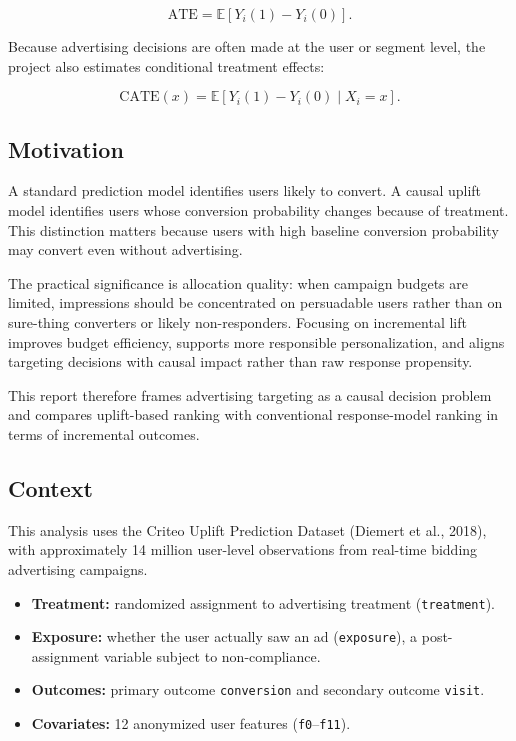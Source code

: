 \documentclass[journal,11pt,onecolumn]{IEEEtran}
\newcommand{\E}{\mathbb{E}}
\newcommand{\ATE}{\mathrm{ATE}}
\newcommand{\CATE}{\mathrm{CATE}}
\begin{document}
\[
    \ATE = \E[Y_i(1)-Y_i(0)].
\]

Because advertising decisions are often made at the user or segment level, the project also estimates conditional treatment effects:

\[
    \CATE(x)=\E[Y_i(1)-Y_i(0)\mid X_i=x].
\]

\subsection{Motivation}

A standard prediction model identifies users likely to convert. A causal uplift model identifies users whose conversion probability changes because of treatment. This distinction matters because users with high baseline conversion probability may convert even without advertising.

The practical significance is allocation quality: when campaign budgets are limited, impressions should be concentrated on persuadable users rather than on sure-thing converters or likely non-responders. Focusing on incremental lift improves budget efficiency, supports more responsible personalization, and aligns targeting decisions with causal impact rather than raw response propensity.

This report therefore frames advertising targeting as a causal decision problem and compares uplift-based ranking with conventional response-model ranking in terms of incremental outcomes.

\subsection{Context}

This analysis uses the Criteo Uplift Prediction Dataset (Diemert et al., 2018), with approximately 14 million user-level observations from real-time bidding advertising campaigns.

\begin{itemize}
    \item \textbf{Treatment:} randomized assignment to advertising treatment (\texttt{treatment}).
    \item \textbf{Exposure:} whether the user actually saw an ad (\texttt{exposure}), a post-assignment variable subject to non-compliance.
    \item \textbf{Outcomes:} primary outcome \texttt{conversion} and secondary outcome \texttt{visit}.
    \item \textbf{Covariates:} 12 anonymized user features (\texttt{f0}--\texttt{f11}).
\end{itemize}
\end{document}
